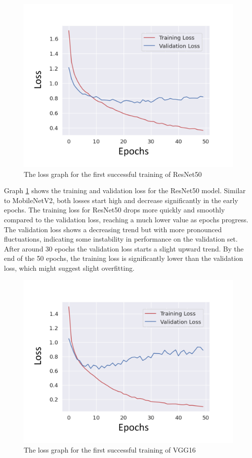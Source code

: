 \begin{figure}[H]
    \centering{}
    \includegraphics[scale=0.5]{fed_images/train_loss_ResNet50_captioned.png}
    \caption{The loss graph for the first successful training of ResNet50}
    \label{figure:loss_rn50}
\end{figure}

Graph \ref{figure:loss_rn50} shows the training and validation loss for the ResNet50 model. Similar to MobileNetV2, both losses start high and decrease significantly in the early epochs. The training loss for ResNet50 drops more quickly and smoothly compared to the validation loss, reaching a much lower value as epochs progress. The validation loss shows a decreasing trend but with more pronounced fluctuations, indicating some instability in performance on the validation set. After around 30 epochs the validation loss starts a slight upward trend. By the end of the 50 epochs, the training loss is significantly lower than the validation loss, which might suggest slight overfitting.

\begin{figure}[H]
    \centering{}
    \includegraphics[scale=0.5]{fed_images/train_loss_VGG16_captioned.png}
    \caption{The loss graph for the first successful training of VGG16}
    \label{figure:loss_vgg16}
\end{figure}

